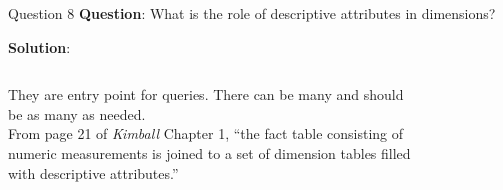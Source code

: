 \begin{frame}[fragile]{Question 8}
	\textbf{Question}: What is the role of descriptive attributes in dimensions?\\\vspace{10pt}
	
	\textbf{Solution}: \\\vspace{5pt}
	\begin{columns}[t,onlytextwidth]
	They are entry point for queries. There can be many and should be as many as needed.\\\vspace{5pt}	
	From page 21 of \textit{Kimball} Chapter 1, ``the fact table consisting of numeric measurements is joined to a set of dimension tables filled with descriptive attributes.''
	\begin{figure}
		\vspace{-15pt}
	\end{figure}
\end{columns}
\end{frame}

